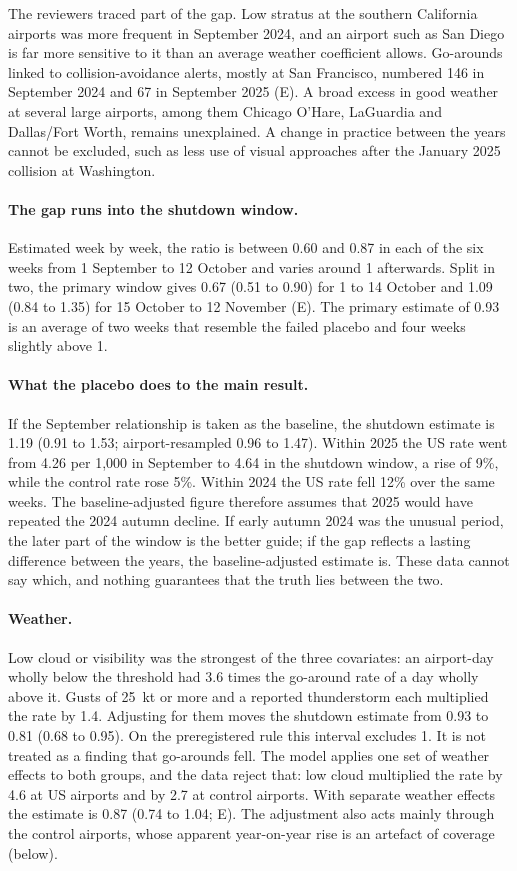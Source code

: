 \documentclass[11pt]{article}
\begin{document}
The reviewers traced part of the gap. Low stratus at the southern California airports was more frequent in September 2024, and an airport such as San Diego is far more sensitive to it than an average weather coefficient allows. Go-arounds linked to collision-avoidance alerts, mostly at San Francisco, numbered 146 in September 2024 and 67 in September 2025 (E). A broad excess in good weather at several large airports, among them Chicago O'Hare, LaGuardia and Dallas/Fort Worth, remains unexplained. A change in practice between the years cannot be excluded, such as less use of visual approaches after the January 2025 collision at Washington.

\paragraph{The gap runs into the shutdown window.} Estimated week by week, the ratio is between 0.60 and 0.87 in each of the six weeks from 1 September to 12 October and varies around 1 afterwards. Split in two, the primary window gives 0.67 (0.51 to 0.90) for 1 to 14 October and 1.09 (0.84 to 1.35) for 15 October to 12 November (E). The primary estimate of 0.93 is an average of two weeks that resemble the failed placebo and four weeks slightly above 1.

\paragraph{What the placebo does to the main result.} If the September relationship is taken as the baseline, the shutdown estimate is 1.19 (0.91 to 1.53; airport-resampled 0.96 to 1.47). Within 2025 the US rate went from 4.26 per 1,000 in September to 4.64 in the shutdown window, a rise of 9\%, while the control rate rose 5\%. Within 2024 the US rate fell 12\% over the same weeks. The baseline-adjusted figure therefore assumes that 2025 would have repeated the 2024 autumn decline. If early autumn 2024 was the unusual period, the later part of the window is the better guide; if the gap reflects a lasting difference between the years, the baseline-adjusted estimate is. These data cannot say which, and nothing guarantees that the truth lies between the two.

\paragraph{Weather.} Low cloud or visibility was the strongest of the three covariates: an airport-day wholly below the threshold had 3.6 times the go-around rate of a day wholly above it. Gusts of 25~kt or more and a reported thunderstorm each multiplied the rate by 1.4. Adjusting for them moves the shutdown estimate from 0.93 to 0.81 (0.68 to 0.95). On the preregistered rule this interval excludes 1. It is not treated as a finding that go-arounds fell. The model applies one set of weather effects to both groups, and the data reject that: low cloud multiplied the rate by 4.6 at US airports and by 2.7 at control airports. With separate weather effects the estimate is 0.87 (0.74 to 1.04; E). The adjustment also acts mainly through the control airports, whose apparent year-on-year rise is an artefact of coverage (below).
\end{document}
